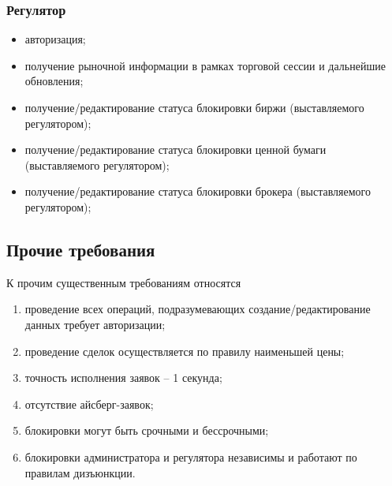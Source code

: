 \documentclass[a4paper, 12pt]{article}        %
\begin{document}
\subsubsection{Регулятор}
\begin{itemize}
\item авторизация;
\item получение рыночной информации в рамках торговой сессии и дальнейшие обновления;
\item получение/редактирование статуса блокировки биржи (выставляемого регулятором);
\item получение/редактирование статуса блокировки ценной бумаги (выставляемого регулятором);
\item получение/редактирование статуса блокировки брокера (выставляемого регулятором);
\end{itemize}


\subsection{Прочие требования}

К прочим существенным требованиям относятся

\begin{enumerate}
\item проведение всех операций, подразумевающих создание/редактирование данных требует авторизации;
\item проведение сделок осуществляется по правилу наименьшей цены;
\item точность исполнения заявок -- 1 секунда;
\item отсутствие айсберг-заявок;
\item блокировки могут быть срочными и бессрочными;
\item блокировки администратора и регулятора независимы и работают по правилам дизъюнкции.
\end{enumerate}
\end{document}
